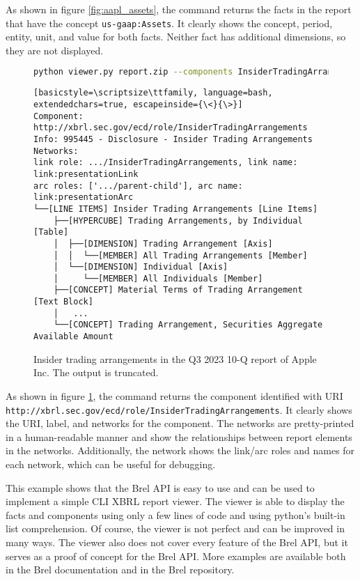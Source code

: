 As shown in figure \ref{fig:aapl_assets}, the command returns the facts in the report that have the concept \texttt{us-gaap:Assets}.
It clearly shows the concept, period, entity, unit, and value for both facts.
Neither fact has additional dimensions, so they are not displayed.

\begin{figure}[H]
    \caption{Insider trading arrangements in the Q3 2023 10-Q report of Apple Inc. The output is truncated.}
    \begin{lstlisting}[language=bash]
python viewer.py report.zip --components InsiderTradingArrangements
\end{lstlisting}
    \begin{lstlisting}[basicstyle=\scriptsize\ttfamily, language=bash, extendedchars=true, escapeinside={\<}{\>}]
Component: http://xbrl.sec.gov/ecd/role/InsiderTradingArrangements
Info: 995445 - Disclosure - Insider Trading Arrangements
Networks: 
link role: .../InsiderTradingArrangements, link name: link:presentationLink
arc roles: ['.../parent-child'], arc name: link:presentationArc
└──[LINE ITEMS] Insider Trading Arrangements [Line Items]
    ├──[HYPERCUBE] Trading Arrangements, by Individual [Table]
    │  ├──[DIMENSION] Trading Arrangement [Axis]
    │  │  └──[MEMBER] All Trading Arrangements [Member]
    │  └──[DIMENSION] Individual [Axis]
    │     └──[MEMBER] All Individuals [Member]
    ├──[CONCEPT] Material Terms of Trading Arrangement [Text Block]
    │   ...
    └──[CONCEPT] Trading Arrangement, Securities Aggregate Available Amount
\end{lstlisting}
\label{fig:aapl_insider_trading}
\end{figure}

As shown in figure \ref{fig:aapl_insider_trading}, 
the command returns the component identified with URI \texttt{http://xbrl.sec.gov/ecd/role/InsiderTradingArrangements}.
It clearly shows the URI, label, and networks for the component.
The networks are pretty-printed in a human-readable manner and 
show the relationships between report elements in the networks.
Additionally, the network shows the link/arc roles and names for each network, which can be useful for debugging.

This example shows that the Brel API is easy to use and can be used to implement a simple CLI XBRL report viewer.
The viewer is able to display the facts and components using only a few lines of code and using python's built-in list comprehension.
Of course, the viewer is not perfect and can be improved in many ways.
The viewer also does not cover every feature of the Brel API, but it serves as a proof of concept for the Brel API.
More examples are available both in the Brel documentation\cite{brel_api} and in the Brel repository\cite{brel_source}.

